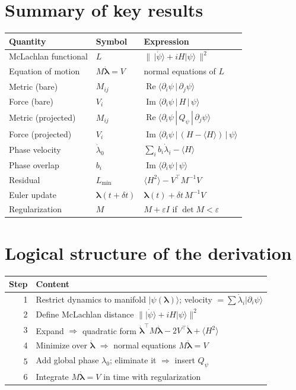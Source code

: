 \documentclass[12pt,a4paper]{article}
\newcommand{\ket}[1]{\lvert #1 \rangle}
\newcommand{\braket}[2]{\langle #1 \,|\, #2 \rangle}
\newcommand{\mel}[3]{\langle #1 \,|\, #2 \,|\, #3 \rangle}
\newcommand{\re}{\operatorname{Re}}
\newcommand{\im}{\operatorname{Im}}
\newcommand{\dlam}{\dot{\boldsymbol{\lambda}}}
\begin{document}
\newpage
\appendix
\section{Summary of key results}

\begin{center}
\renewcommand{\arraystretch}{1.5}
\begin{tabular}{lll}
\toprule
\textbf{Quantity} & \textbf{Symbol} & \textbf{Expression}\\
\midrule
McLachlan functional & $L$ & $\big\|\,\ket{\dot\psi}+iH\ket{\psi}\,\big\|^2$\\
Equation of motion & $M\dlam=V$ & normal equations of $L$\\
Metric (bare) & $M_{ij}$ & $\re\braket{\partial_i\psi}{\partial_j\psi}$\\
Force (bare) & $V_i$ & $\im\mel{\partial_i\psi}{H}{\psi}$\\
Metric (projected) & $M_{ij}$ & $\re\mel{\partial_i\psi}{Q_\psi}{\partial_j\psi}$\\
Force (projected) & $V_i$ & $\im\mel{\partial_i\psi}{(H-\langle H\rangle)}{\psi}$\\
Phase velocity & $\dot\lambda_0$ & $\sum_i b_i\dot\lambda_i-\langle H\rangle$\\
Phase overlap & $b_i$ & $\im\braket{\partial_i\psi}{\psi}$\\
Residual & $L_{\min}$ & $\langle H^2\rangle-V^{\!\top}M^{-1}V$\\
Euler update & $\boldsymbol{\lambda}(t{+}\delta t)$ & $\boldsymbol{\lambda}(t)+\delta t\,M^{-1}V$\\
Regularization & $M$ & $M+\varepsilon I$ if $\det M<\varepsilon$\\
\bottomrule
\end{tabular}
\end{center}

\section*{Logical structure of the derivation}
\begin{center}
\renewcommand{\arraystretch}{1.3}
\begin{tabular}{rl}
\toprule
Step & Content\\
\midrule
1 & Restrict dynamics to manifold $\ket{\psi(\boldsymbol{\lambda})}$; velocity $=\sum\dot\lambda_i\ket{\partial_i\psi}$ \\
2 & Define McLachlan distance $\|\ket{\dot\psi}+iH\ket{\psi}\|^2$ \\
3 & Expand $\Rightarrow$ quadratic form $\dlam^{\!\top}M\dlam-2V^{\!\top}\dlam+\langle H^2\rangle$ \\
4 & Minimize over $\dlam$ $\Rightarrow$ normal equations $M\dlam=V$ \\
5 & Add global phase $\lambda_0$; eliminate it $\Rightarrow$ insert $Q_\psi$ \\
6 & Integrate $M\dlam=V$ in time with regularization \\
\bottomrule
\end{tabular}
\end{center}
\end{document}
